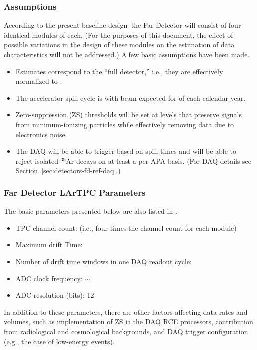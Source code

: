 \subsubsection{Assumptions}
\label{sec:detectors-sc-infrastructure-assumptions}
According to the present baseline design, the Far Detector will
consist of four identical modules of \tpcmodulemass each.  (For the
purposes of %
this document, %
the effect of possible variations in the design of these modules on the 
estimation of data characteristics will not be
addressed.) A few basic assumptions have been made.
\begin{itemize}
\item Estimates correspond to the ``full detector,''
  i.e., they are effectively normalized to \dunedetectormass.
\item The accelerator spill cycle is \beamspillcycle with beam expected
  for \beamrunfraction of each calendar year.
\item Zero-suppression (ZS) thresholds will be set at levels that preserve
  signals from minimum-ionizing particles while effectively removing
  data due to electronics noise.
\item The DAQ will be able to trigger based on spill times and will be
  able to reject isolated $^{39}$Ar decays on at least a per-APA
  basis. (For DAQ details see Section~\ref{sec:detectors-fd-ref-daq}.)
\end{itemize}

\subsubsection{Far Detector LArTPC Parameters}
The basic parameters presented below are also listed in \anxrates.
\begin{itemize}
\item TPC channel count: \dunenumberchannels (i.e., four times the
  \daqchannelspermodule channel count for each \tpcmodulemass module)
\item Maximum drift Time: \tpcdrifttime
\item Number of drift time windows in one DAQ readout cycle: \daqdriftsperreadout
\item ADC clock frequency: $\sim$\daqsamplerate
\item ADC resolution (bits): 12
\end{itemize}

In addition to these parameters, there are other factors
affecting data rates and volumes, such as implementation of ZS in the DAQ RCE processors,
contribution from radiological and cosmological backgrounds, and DAQ
trigger configuration (e.g., the case of low-energy events). 

